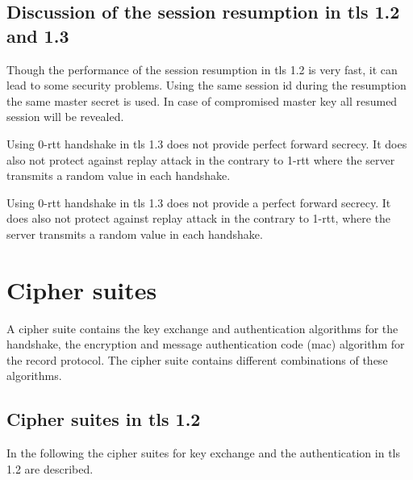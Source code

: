 \subsection{Discussion of the session resumption in \gls{tls} 1.2 and 1.3}
\label{subsec:discussion_resumption}
Though the performance of the session resumption in \gls{tls} 1.2 is very fast, it can lead to some security problems. Using the same session id during the resumption the same master secret is used. In case of compromised master key all resumed session will be revealed.

Using 0-\gls{rtt} handshake in \gls{tls} 1.3 does not provide perfect forward secrecy. It does also not protect against replay attack in the contrary to 1-\gls{rtt} where the server transmits a random value in each handshake.

Using 0-\gls{rtt} handshake in \gls{tls} 1.3 does not provide a perfect forward secrecy. It does also not protect against replay attack in the contrary to 1-\gls{rtt}, where the server transmits a random value in each handshake.
\cite{recorla}

\section{Cipher suites}
\label{sec:comparison_ciphersuits}

A cipher suite contains the key exchange and authentication algorithms for the handshake, the encryption and message authentication code (\gls{mac}) algorithm for the record protocol. The cipher suite contains different combinations of these algorithms.

\subsection{Cipher suites in \gls{tls} 1.2}
\label{subsec:ciphersuits1_2}

In the following the cipher suites for key exchange and the authentication in \gls{tls} 1.2 are described.

